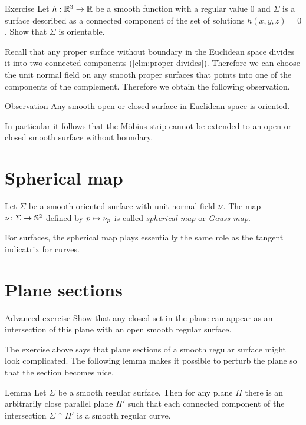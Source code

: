 \begin{thm}{Exercise}\label{ex:implicit-orientable}
Let $h:\mathbb{R}^3\to\mathbb{R}$ be a smooth function with a regular value $0$ and $\Sigma$ is a surface described as a connected component of the set of solutions $h(x,y,z)=0$.
Show that $\Sigma$ is orientable.
\end{thm}

Recall that any proper surface without boundary in the Euclidean space divides it into two connected components (\ref{clm:proper-divides}).
Therefore we can choose the unit normal field on any smooth proper surfaces that points into one of the components of the complement.
Therefore we obtain the following observation. 

\begin{thm}{Observation}
Any smooth open or closed surface in Euclidean space is oriented.
\end{thm}

In particular it follows that the M\"obius strip cannot be extended to an open or closed smooth surface without boundary.

\section*{Spherical map}

Let $\Sigma$ be a smooth oriented surface with unit normal field $\nu$.
The map $\nu\colon\Sigma\to \mathbb{S}^2$ defined by $p\mapsto \nu_p$ is called \emph{spherical map} or \emph{Gauss map}.

For surfaces, the spherical map plays essentially the same role as the tangent indicatrix for curves.

\section*{Plane sections}

\begin{thm}{Advanced exercise}
Show that any closed set in the plane can appear as an intersection of this plane with an open smooth regular surface.  
\end{thm}

The exercise above says that plane sections of a smooth regular surface might look complicated.
The following lemma makes it possible to perturb the plane so that the section becomes nice.

\begin{thm}{Lemma}\label{lem:reg-section}
Let $\Sigma$ be a smooth regular surface.
Then for any plane $\Pi$ there is an arbitrarily close parallel plane $\Pi'$ such that 
each connected component of the intersection $\Sigma\cap \Pi'$ is a smooth regular curve.
\end{thm}


